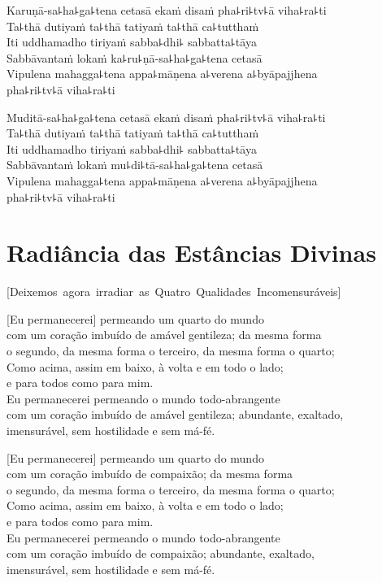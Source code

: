 Karuṇā-sa꜕ha꜕ga꜕tena cetasā ekaṁ disaṁ pha꜕ri꜕tv꜕ā viha꜕ra꜕ti\\
Ta꜕thā dutiyaṁ ta꜕thā tatiyaṁ ta꜕thā ca꜕tutthaṁ\\
Iti uddhamadho tiriyaṁ sabba꜕dhi꜕ sabbatta꜕tāya\\
Sabbāvantaṁ lokaṁ ka꜕ru꜕ṇā-sa꜕ha꜕ga꜕tena cetasā\\
Vipulena mahagga꜕tena appa꜕māṇena a꜕verena a꜕byāpajjhena\\
\vin pha꜕ri꜕tv꜕ā viha꜕ra꜕ti

Muditā-sa꜕ha꜕ga꜕tena cetasā ekaṁ disaṁ pha꜕ri꜕tv꜕ā viha꜕ra꜕ti\\
Ta꜕thā dutiyaṁ ta꜕thā tatiyaṁ ta꜕thā ca꜕tutthaṁ\\
Iti uddhamadho tiriyaṁ sabba꜕dhi꜕ sabbatta꜕tāya\\
Sabbāvantaṁ lokaṁ mu꜕di꜕tā-sa꜕ha꜕ga꜕tena cetasā\\
Vipulena mahagga꜕tena appa꜕māṇena a꜕verena a꜕byāpajjhena\\
\vin pha꜕ri꜕tv꜕ā viha꜕ra꜕ti

\chapter[Radiância das Estâncias Divinas]{Radiância das Estâncias Divinas}

\enlargethispage{\baselineskip}


\begin{leader}
  \vspace*{-\baselineskip}
  \mbox{[Deixemos agora irradiar as Quatro Qualidades Incomensuráveis]}
\end{leader}

[Eu permanecerei] permeando um quarto do mundo\\
\vin com um coração imbuído de amável gentileza; da mesma forma\\
\vin o segundo, da mesma forma o terceiro, da mesma forma o quarto;\\
Como acima, assim em baixo, à volta e em todo o lado;\\
\vin e para todos como para mim.\\
Eu permanecerei permeando o mundo todo-abrangente\\
\vin com um coração imbuído de amável gentileza; abundante, exaltado,\\
\vin imensurável, sem hostilidade e sem má-fé.

[Eu permanecerei] permeando um quarto do mundo\\
\vin com um coração imbuído de compaixão; da mesma forma\\
\vin o segundo, da mesma forma o terceiro, da mesma forma o quarto;\\
Como acima, assim em baixo, à volta e em todo o lado;\\
\vin e para todos como para mim.\\
Eu permanecerei permeando o mundo todo-abrangente\\
\vin com um coração imbuído de compaixão; abundante, exaltado,\\
\vin imensurável, sem hostilidade e sem má-fé.

